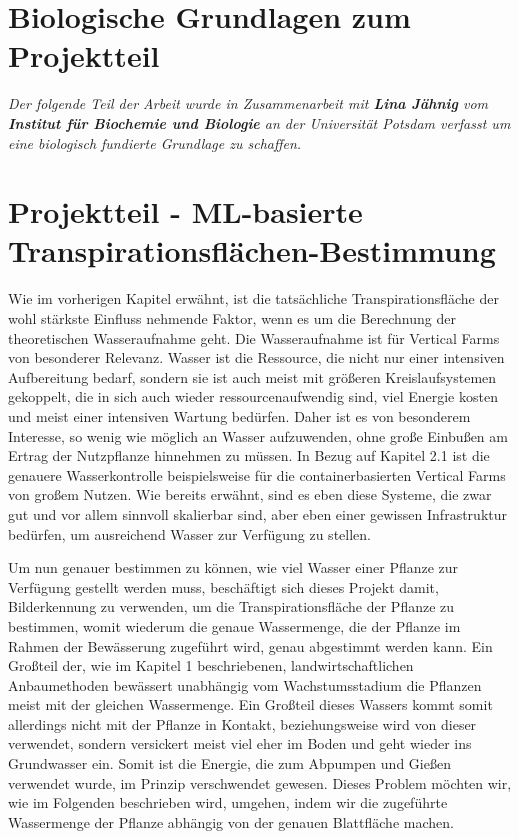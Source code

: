 \section{Biologische Grundlagen zum Projektteil}
\textit{Der folgende Teil der Arbeit wurde in Zusammenarbeit mit \textbf{Lina Jähnig} vom \textbf{Institut für Biochemie und Biologie} an der Universität Potsdam verfasst um eine biologisch fundierte Grundlage zu schaffen.}
\newpage

\section{Projektteil - ML-basierte Transpirationsflächen-Bestimmung}
Wie im vorherigen Kapitel erwähnt, ist die tatsächliche Transpirationsfläche der wohl stärkste Einfluss nehmende Faktor, wenn es um die Berechnung der theoretischen Wasseraufnahme geht. Die Wasseraufnahme ist für Vertical Farms von besonderer Relevanz. Wasser ist die Ressource, die nicht nur einer intensiven Aufbereitung bedarf, sondern sie ist auch meist mit größeren Kreislaufsystemen gekoppelt, die in sich auch wieder ressourcenaufwendig sind, viel Energie kosten und meist einer intensiven Wartung bedürfen. Daher ist es von besonderem Interesse, so wenig wie möglich an Wasser aufzuwenden, ohne große Einbußen am Ertrag der Nutzpflanze hinnehmen zu müssen. In Bezug auf Kapitel 2.1 ist die genauere Wasserkontrolle beispielsweise für die containerbasierten Vertical Farms von großem Nutzen. Wie bereits erwähnt, sind es eben diese Systeme, die zwar gut und vor allem sinnvoll skalierbar sind, aber eben einer gewissen Infrastruktur bedürfen, um ausreichend Wasser zur Verfügung zu stellen. \newline \par
Um nun genauer bestimmen zu können, wie viel Wasser einer Pflanze zur Verfügung gestellt werden muss, beschäftigt sich dieses Projekt damit, Bilderkennung zu verwenden, um die Transpirationsfläche der Pflanze zu bestimmen, womit wiederum die genaue Wassermenge, die der Pflanze im Rahmen der Bewässerung zugeführt wird, genau abgestimmt werden kann. Ein Großteil der, wie im Kapitel 1 beschriebenen, landwirtschaftlichen Anbaumethoden bewässert unabhängig vom Wachstumsstadium die Pflanzen meist mit der gleichen Wassermenge. Ein Großteil dieses Wassers kommt somit allerdings nicht mit der Pflanze in Kontakt, beziehungsweise wird von dieser verwendet, sondern versickert meist viel eher im Boden und geht wieder ins Grundwasser ein. Somit ist die Energie, die zum Abpumpen und Gießen verwendet wurde, im Prinzip verschwendet gewesen. Dieses Problem möchten wir, wie im Folgenden beschrieben wird, umgehen, indem wir die zugeführte Wassermenge der Pflanze abhängig von der genauen Blattfläche machen.
